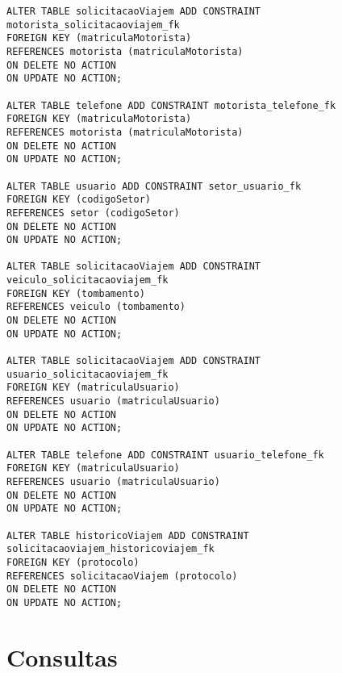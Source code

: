\documentclass[11pt]{article}
\begin{document}
\begin{verbatim}
ALTER TABLE solicitacaoViajem ADD CONSTRAINT motorista_solicitacaoviajem_fk
FOREIGN KEY (matriculaMotorista)
REFERENCES motorista (matriculaMotorista)
ON DELETE NO ACTION
ON UPDATE NO ACTION;

ALTER TABLE telefone ADD CONSTRAINT motorista_telefone_fk
FOREIGN KEY (matriculaMotorista)
REFERENCES motorista (matriculaMotorista)
ON DELETE NO ACTION
ON UPDATE NO ACTION;

ALTER TABLE usuario ADD CONSTRAINT setor_usuario_fk
FOREIGN KEY (codigoSetor)
REFERENCES setor (codigoSetor)
ON DELETE NO ACTION
ON UPDATE NO ACTION;

ALTER TABLE solicitacaoViajem ADD CONSTRAINT veiculo_solicitacaoviajem_fk
FOREIGN KEY (tombamento)
REFERENCES veiculo (tombamento)
ON DELETE NO ACTION
ON UPDATE NO ACTION;

ALTER TABLE solicitacaoViajem ADD CONSTRAINT usuario_solicitacaoviajem_fk
FOREIGN KEY (matriculaUsuario)
REFERENCES usuario (matriculaUsuario)
ON DELETE NO ACTION
ON UPDATE NO ACTION;

ALTER TABLE telefone ADD CONSTRAINT usuario_telefone_fk
FOREIGN KEY (matriculaUsuario)
REFERENCES usuario (matriculaUsuario)
ON DELETE NO ACTION
ON UPDATE NO ACTION;

ALTER TABLE historicoViajem ADD CONSTRAINT solicitacaoviajem_historicoviajem_fk
FOREIGN KEY (protocolo)
REFERENCES solicitacaoViajem (protocolo)
ON DELETE NO ACTION
ON UPDATE NO ACTION;

\end{verbatim}

\section{Consultas}
\end{document}
